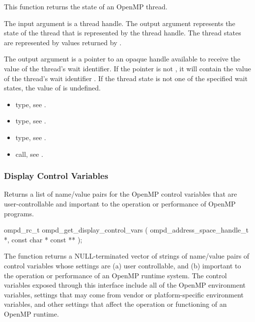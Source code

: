 \descr
This function returns the state of an OpenMP thread.

\argdesc

The input argument  is a thread handle. The output argument
 represents the state of the thread that is represented by the thread handle.
The thread states are represented by values returned by .

The output argument  is a pointer to an opaque handle available to receive the value
of the thread's wait identifier. If the  pointer is not , it will contain
the value of the thread's wait identifier . If the thread state is not one of the
specified wait states, the value of  is undefined.

\crossreferences
\begin{itemize}
	\item {} type, see .
	\item {} type, see .
	\item {} type, see .
	\item {} call, see 
	.
\end{itemize}


\subsubsection{Display Control Variables}

\label{subsubsubsec:ompd_get_display_control_vars}
\summary
Returns a list of name/value pairs for the OpenMP control variables
that are user-controllable and important to the operation or
performance of OpenMP programs.
\format
\begin{cspecific}
\begin{ompSyntax}
ompd_rc_t ompd_get_display_control_vars (
  ompd_address_space_handle_t *,
  const char * const **
);
\end{ompSyntax}
\end{cspecific}

\descr
The function  returns a
NULL-terminated vector of strings of name/value pairs of control
variables whose settings are (a) user controllable,
and (b) important to the operation or performance of an OpenMP
runtime system.
The control variables exposed through this interface include all
of the OpenMP environment variables, settings that may come from
vendor or platform-specific environment variables, and other
settings that affect the operation or functioning of an OpenMP
runtime.

